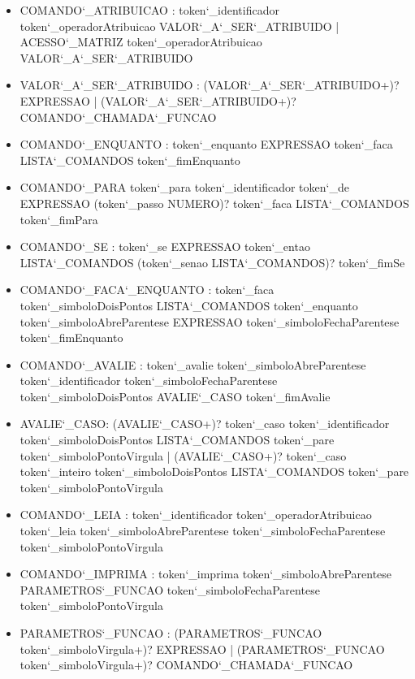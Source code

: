 \documentclass[
12pt,				%
a4paper,			%
english,			%
french,				%
spanish,			%
brazil,				%
article
]{abntex2}
\begin{document}
\begin{itemize}
	\item COMANDO\char`_ATRIBUICAO : token\char`_identificador token\char`_operadorAtribuicao VALOR\char`_A\char`_SER\char`_ATRIBUIDO | ACESSO\char`_MATRIZ token\char`_operadorAtribuicao VALOR\char`_A\char`_SER\char`_ATRIBUIDO
	\item VALOR\char`_A\char`_SER\char`_ATRIBUIDO : (VALOR\char`_A\char`_SER\char`_ATRIBUIDO+)? EXPRESSAO |  (VALOR\char`_A\char`_SER\char`_ATRIBUIDO+)? COMANDO\char`_CHAMADA\char`_FUNCAO
	\item COMANDO\char`_ENQUANTO : token\char`_enquanto EXPRESSAO token\char`_faca LISTA\char`_COMANDOS token\char`_fimEnquanto
	\item COMANDO\char`_PARA token\char`_para token\char`_identificador token\char`_de EXPRESSAO (token\char`_passo NUMERO)? token\char`_faca LISTA\char`_COMANDOS token\char`_fimPara
	\item COMANDO\char`_SE : token\char`_se EXPRESSAO token\char`_entao LISTA\char`_COMANDOS (token\char`_senao LISTA\char`_COMANDOS)? token\char`_fimSe
	\item COMANDO\char`_FACA\char`_ENQUANTO : token\char`_faca token\char`_simboloDoisPontos LISTA\char`_COMANDOS token\char`_enquanto token\char`_simboloAbreParentese EXPRESSAO token\char`_simboloFechaParentese token\char`_fimEnquanto
	\item COMANDO\char`_AVALIE : token\char`_avalie token\char`_simboloAbreParentese token\char`_identificador token\char`_simboloFechaParentese token\char`_simboloDoisPontos AVALIE\char`_CASO token\char`_fimAvalie
	\item AVALIE\char`_CASO: (AVALIE\char`_CASO+)? token\char`_caso token\char`_identificador token\char`_simboloDoisPontos LISTA\char`_COMANDOS token\char`_pare token\char`_simboloPontoVirgula | (AVALIE\char`_CASO+)? token\char`_caso token\char`_inteiro token\char`_simboloDoisPontos LISTA\char`_COMANDOS token\char`_pare token\char`_simboloPontoVirgula
	\item COMANDO\char`_LEIA : token\char`_identificador token\char`_operadorAtribuicao token\char`_leia token\char`_simboloAbreParentese token\char`_simboloFechaParentese token\char`_simboloPontoVirgula
	\item COMANDO\char`_IMPRIMA : token\char`_imprima token\char`_simboloAbreParentese PARAMETROS\char`_FUNCAO token\char`_simboloFechaParentese token\char`_simboloPontoVirgula
	\item PARAMETROS\char`_FUNCAO : (PARAMETROS\char`_FUNCAO token\char`_simboloVirgula+)? EXPRESSAO | (PARAMETROS\char`_FUNCAO token\char`_simboloVirgula+)? COMANDO\char`_CHAMADA\char`_FUNCAO

\end{itemize}
\end{document}
